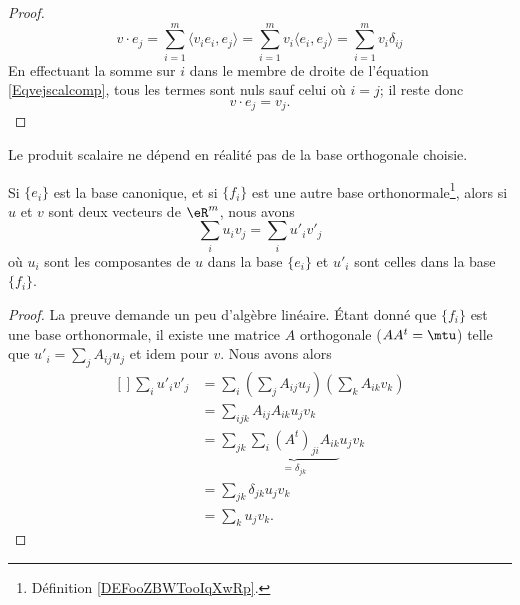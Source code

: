 \begin{proof}
	\begin{equation}    \label{Eqvejscalcomp}
		v\cdot e_j=\sum_{i=1}^m\langle v_ie_i, e_j\rangle =\sum_{i=1}^mv_i\langle e_i, e_j\rangle =\sum_{i=1}^mv_i\delta_{ij}
	\end{equation}
	En effectuant la somme sur \( i\) dans le membre de droite de l'équation \eqref{Eqvejscalcomp}, tous les termes sont nuls sauf celui où \( i=j\); il reste donc
	\begin{equation}
		v\cdot e_j=v_j.
	\end{equation}
\end{proof}

Le produit scalaire ne dépend en réalité pas de la base orthogonale choisie.

\begin{lemma}
	Si \( \{ e_i \}\) est la base canonique, et si \( \{ f_i \}\) est une autre base orthonormale\footnote{Définition \ref{DEFooZBWTooIqXwRp}.}, alors si \( u\) et \( v\) sont deux vecteurs de \( \eR^m\), nous avons
	\begin{equation}
		\sum_i u_iv_j=\sum_iu'_iv'_j
	\end{equation}
	où \( u_i\) sont les composantes de \( u\) dans la base \( \{ e_i \}\) et \( u'_i\) sont celles dans la base \( \{ f_i \}\).
\end{lemma}

\begin{proof}
	La preuve demande un peu d'algèbre linéaire. Étant donné que $\{ f_i \}$ est une base orthonormale, il existe une matrice $A$ orthogonale ($AA^t=\mtu$) telle que $u'_i=\sum_jA_{ij}u_j$ et idem pour $v$. Nous avons alors
	\begin{equation}
		\begin{aligned}[]
			\sum_iu'_iv'_j & =\sum_i\left( \sum_jA_{ij} u_j\right)\left( \sum_k A_{ik}v_k \right) \\
			               & =\sum_{ijk}A_{ij}A_{ik}u_jv_k                                        \\
			               & =\sum_{jk}\underbrace{\sum_i(A^t)_{ji}A_{ik}}_{=\delta_{jk}}u_jv_k   \\
			               & =\sum_{jk}\delta_{jk}u_jv_k                                          \\
			               & =\sum_ku_jv_k.
		\end{aligned}
	\end{equation}
\end{proof}

